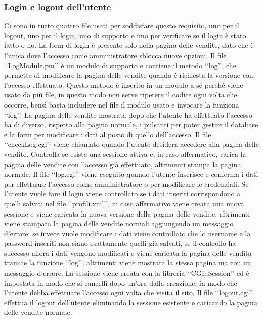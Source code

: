 {{		\subsubsection{Login e logout dell'utente}
			Ci sono in tutto quattro file usati per soddisfare questo requisito, uno per il logout, uno per il login, uno di supporto e uno per verificare se il login è stato fatto o no. La form di login è presente solo nella pagina delle vendite, dato che è l'unica dove l'accesso come amministratore sblocca nuove opzioni.
			Il file ‘‘LogModule.pm’’ è un modulo di supporto e contiene il metodo ‘‘log’’, che permette di modificare la pagina delle vendite quando è richiesta la versione con l'accesso effettuato. Questo metodo è inserito in un modulo a sé perché viene usato da più file, in questo modo non serve ripetere il codice ogni volta che occorre, bensì basta includere nel file il modulo usato e invocare la funziona ‘‘log’’. La pagina delle vendite mostrata dopo che l'utente ha effettuato l'accesso ha di diverso, rispetto alla pagina normale, i pulsanti per poter gestire il database e la form per modificare i dati al posto di quello dell'accesso.
			Il file ‘‘checkLog.cgi’’ viene chiamato quando l'utente desidera accedere alla pagina delle vendite. Controlla se esiste una sessione attiva e, in caso affermativo, carica la pagina delle vendite con l'accesso già effettuato, altrimenti stampa la pagina normale.
			Il file ‘‘log.cgi’’ viene eseguito quando l'utente inserisce e conferma i dati per effettuare l'accesso come amministratore o per modificare le credenziali. Se l'utente vuole fare il login viene controllato se i dati inseriti corrispondono a quelli salvati nel file ‘‘profili.xml’’, in caso affermativo viene creata una nuova sessione e viene caricata la nuova versione della pagina delle vendite, altrimenti viene stampata la pagina delle vendite normali aggiungendo un messaggio d'errore; se invece vuole modificare i dati viene controllato che lo username e la password inseriti non siano esattamente quelli già salvati, se il controllo ha successo allora i dati vengono modificati e viene caricata la pagina delle vendita tramite la funzione ‘‘log’’, altrimenti viene mostrata la stessa pagina ma con un messaggio d'errore. La sessione viene creata con la libreria ‘‘CGI::Session’’ ed è impostata in modo che si cancelli dopo un'ora dalla creazione, in modo che l'utente debba effettuare l'accesso ogni volta che visita il sito.
			Il file ‘‘logout.cgi’’ effettua il logout dell'utente eliminando la sessione esistente e caricando la pagina delle vendite normale.
}}
